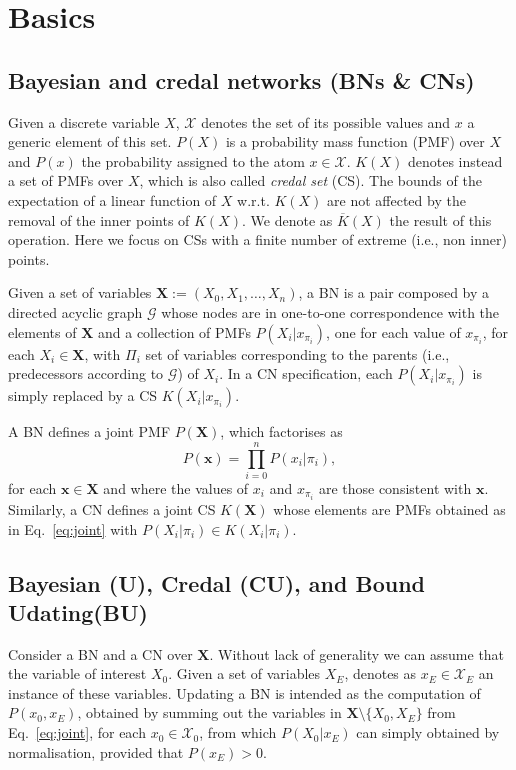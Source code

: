 \section{Basics}\label{sec:basics}
\subsection{Bayesian and credal networks (BNs \& CNs)}
Given a discrete variable $X$, $\mathcal{X}$ denotes the set of its possible values and $x$ a generic element of this set. $P(X)$ is a probability mass function (PMF) over $X$ and $P(x)$ the probability assigned to the atom $x\in\mathcal{X}$. $K(X)$ denotes instead a set of PMFs over $X$, which is also called \emph{credal set} (CS). The bounds of the expectation of a linear function of $X$ w.r.t. $K(X)$ are not affected by the removal of the inner points of $K(X)$. We denote as $\overline{K}(X)$ the result of this operation. Here we focus on CSs with a finite number of extreme (i.e., non inner) points.


Given a set of variables $\bm{X}:=(X_0,X_1,\ldots,X_n)$, a BN is a pair composed by a directed acyclic graph $\mathcal{G}$ whose nodes are in one-to-one correspondence with the elements of $\bm{X}$ and a collection of PMFs $P(X_i|x_{\pi_i})$, one for each value of $x_{\pi_i}$, for each $X_i \in \bm{X}$, with $\Pi_i$ set of variables corresponding to the parents (i.e., predecessors according to $\mathcal{G}$) of $X_i$. In a CN specification, each $P(X_i|x_{\pi_i})$ is simply replaced by a CS $K(X_i|x_{\pi_i})$.

A BN defines a joint PMF $P(\bm{X})$, which factorises as \begin{equation}\label{eq:joint}
P(\bm{x}) = \prod_{i=0}^n P(x_i|\pi_i),
\end{equation}
for each $\bm{x}\in\mathcal{\bm{X}}$ and where the values of $x_i$ and $x_{\pi_i}$ are those consistent with $\bm{x}$. Similarly, a CN defines a joint CS $K(\bm{X})$ whose elements are PMFs obtained as in Eq.~\ref{eq:joint} with $P(X_i|\pi_i)\in K(X_i|\pi_i)$. 

\subsection{Bayesian (U), Credal (CU), and Bound Udating(BU)}
Consider a BN and a CN over $\bm{X}$. Without lack of generality we can assume that the variable of interest $X_0$. Given a set of variables $X_E$, denotes as $x_E\in\mathcal{X}_E$ an instance of these variables. Updating a BN is intended as the computation of $P(x_0,x_E)$, obtained by summing out the variables in $\bm{X}\setminus \{X_0,X_E\}$ from Eq.~\ref{eq:joint}, for each $x_0\in\mathcal{X}_0$, from which $P(X_0|x_E)$ can simply obtained by normalisation, provided that $P(x_E)>0$.

